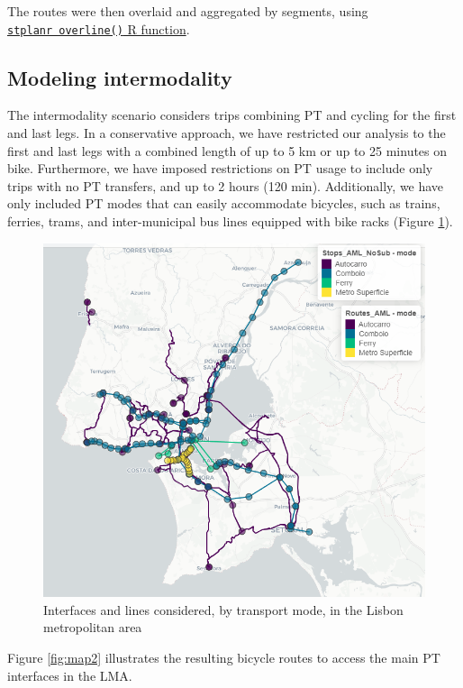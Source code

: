 \documentclass[runningheads]{llncs}
\begin{document}
The routes were then overlaid and aggregated by segments, using
\href{https://docs.ropensci.org/stplanr/reference/overline.html}{\texttt{stplanr\ overline()}
R function}.

\hypertarget{modeling-intermodality}{%
\subsection{Modeling intermodality}\label{modeling-intermodality}}

The intermodality scenario considers trips combining PT and cycling for
the first and last legs. In a conservative approach, we have restricted
our analysis to the first and last legs with a combined length of up to
5 km or up to 25 minutes on bike. Furthermore, we have imposed
restrictions on PT usage to include only trips with no PT transfers, and
up to 2 hours (120 min). Additionally, we have only included PT modes
that can easily accommodate bicycles, such as trains, ferries, trams,
and inter-municipal bus lines equipped with bike racks (Figure
\ref{fig:map1}).

\begin{figure}

{\centering \includegraphics[width=0.6\linewidth,]{img/map1} 

}

\caption{Interfaces and lines considered, by transport mode, in the Lisbon metropolitan area}\label{fig:map1}
\end{figure}

Figure \ref{fig:map2} illustrates the resulting bicycle routes to access
the main PT interfaces in the LMA.
\end{document}
